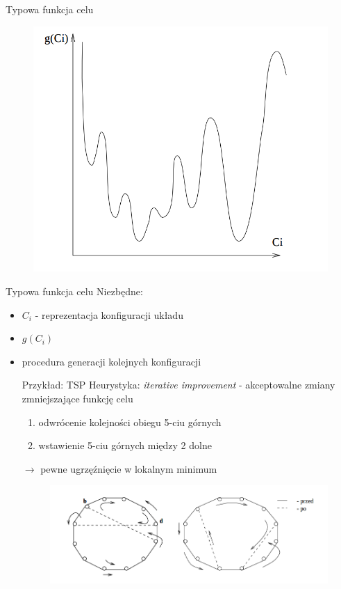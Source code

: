 
	\begin{frame}{Typowa funkcja celu}
		\begin{figure}
			\includegraphics[height=0.9\textheight]{img/18/target_fun}
		\end{figure}
	\end{frame}	
	

	\begin{frame}{Typowa funkcja celu}
		Niezbędne:
		\begin{itemize}
			\item $C_i$ - reprezentacja konfiguracji układu
			\item $g(C_i)$
			\item procedura generacji kolejnych konfiguracji
			\begin{exampleblock}{Przykład: TSP \cite{lin}}
							Heurystyka: \textit{iterative improvement} - akceptowalne zmiany zmniejszające funkcję celu
							\begin{enumerate}
								\item odwrócenie kolejności obiegu 5-ciu górnych
								\item wstawienie 5-ciu górnych między 2 dolne
							\end{enumerate}	
							$\rightarrow$ pewne ugrzęźnięcie w lokalnym minimum			
							\begin{figure}
										\includegraphics[height=0.2\textheight]{img/18/tsp}
							\end{figure}
						\end{exampleblock}
		\end{itemize}
	\end{frame}	
	

